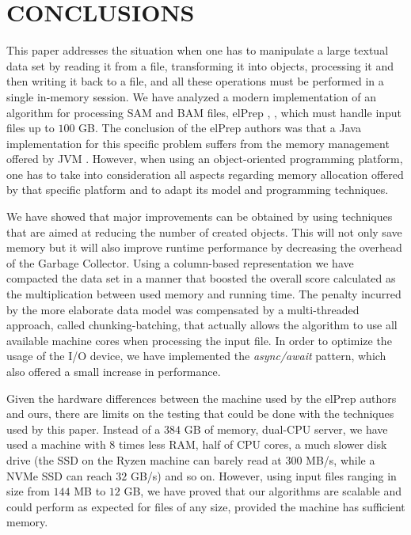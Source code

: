 \documentclass[a4paper,twoside]{article}
\begin{document}
\section{\uppercase{Conclusions}}
\label{sec:conclusions}
This paper addresses the situation when one has to manipulate a large textual data set by reading it from a file, transforming it into objects, processing it and then writing it back to a file, and all these operations must be performed in a single in-memory session.
We have analyzed a modern implementation of an algorithm for processing SAM and BAM files, elPrep \cite{herzeel:2015}, \cite{herzeel:2019}, which must handle input files up to $100$ GB.
The conclusion of the elPrep authors was that a Java implementation for this specific problem suffers from the memory management offered by JVM \cite{costanza:2019}.
However, when using an object-oriented programming platform, one has to take into consideration all aspects regarding memory allocation offered by that specific platform and to adapt its model and programming techniques.

We have showed that major improvements can be obtained by using techniques that are aimed at reducing the number of created objects.
This will not only save memory but it will also improve runtime performance by decreasing the overhead of the Garbage Collector.
Using a column-based representation we have compacted the data set in a manner that boosted the overall score calculated as the multiplication between used memory and running time.
The penalty incurred by the more elaborate data model was compensated by a multi-threaded approach, called chunking-batching, that actually allows the algorithm to use all available machine cores when processing the input file.
In order to optimize the usage of the I/O device, we have implemented the {\textit{async/await} } pattern, which also offered a small increase in performance.

Given the hardware differences between the machine used by the elPrep authors and ours, there are limits on the testing that could be done with the techniques used by this paper.
Instead of a $384$ GB of memory, dual-CPU server, we have used a machine  with $8$ times less RAM, half of CPU cores, a much slower disk drive (the SSD on the Ryzen machine can barely read at 300 MB/s, while a NVMe SSD can reach $32$ GB/s) and so on.
However, using input files ranging in size from $144$ MB to $12$ GB, we have proved that our algorithms are scalable and could perform as expected for files of any size, provided the machine has sufficient memory.






{\small
}
\end{document}
